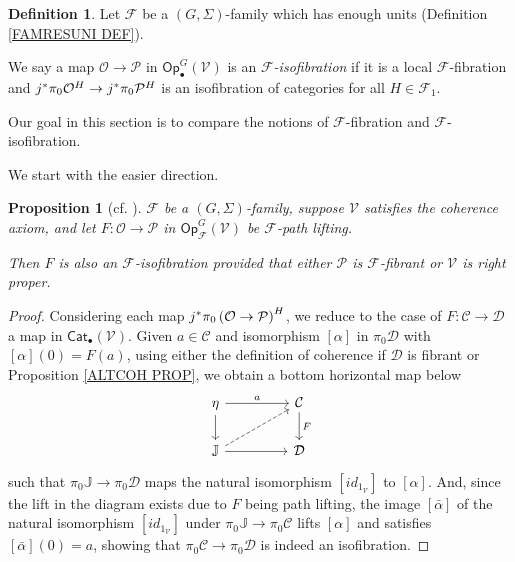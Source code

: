 \documentclass[a4paper,10pt
,draft
]{article}%
\numberwithin{equation}{section}
\numberwithin{figure}{section}
\newtheorem{proposition}[equation]{Proposition}%
\theoremstyle{definition} %
\newtheorem{definition}[equation]{Definition}%
\newcommand{\Op}{\mathsf{Op}}%
\newcommand{\F}{\ensuremath{\mathcal F}}
\newcommand{\V}{\ensuremath{\mathcal V}}
\renewcommand{\O}{\ensuremath{\mathcal O}}
\renewcommand{\P}{\ensuremath{\mathcal P}}
\newcommand{\1}{\ensuremath{\mathbbm 1}}%
\begin{document}
\begin{definition}
	Let $\F$ be a $(G,\Sigma)$-family which has enough units
	(Definition \ref{FAMRESUNI DEF}).
	
	We say a map $\O \to \P$ in $\Op_\bullet^G(\V)$ is an \textit{$\F$-isofibration} if
	it is a local $\F$-fibration and
	$j^{\**}\pi_0 \O^H \to j^{\**}\pi_0\P^H$
	is an isofibration of categories for all $H \in \F_1$.
\end{definition}


Our goal in this section is to compare the 
notions of $\F$-fibration and $\F$-isofibration.

We start with the easier direction.


\begin{proposition}[{cf. \cite[Prop. 2.3]{Ber07b}}]
	\label{ISOFIBEASY PROP}
	$\F$ be a $(G,\Sigma)$-family, 
	suppose $\V$ satisfies the coherence axiom,
	and let 
	$F: \O \to \P$ in $\Op^G_\F(\V)$
	be $\F$-path lifting.
	
	Then $F$ is also an $\F$-isofibration
	provided that either $\mathcal{P}$ is $\F$-fibrant
	or $\V$ is right proper.
\end{proposition}


\begin{proof}
	Considering each map 
	$j^{\**} \pi_0\left(\O \to \P \right)^H$,
	we reduce to 
	the case of $F \colon \mathcal{C} \to \mathcal{D}$
	a map in $\mathsf{Cat}_{\bullet} (\V)$.
	Given $a \in \mathcal{C}$
	and isomorphism $[\alpha]$ in $\pi_0 \mathcal{D}$
	with $[\alpha](0)=F(a)$,
	using either the definition of coherence 
	if $\mathcal{D}$ is fibrant or 
	Proposition \ref{ALTCOH PROP},
	we obtain a bottom horizontal map below 
	\begin{equation}
	\begin{tikzcd}[column sep = 45pt]
	\eta \ar{d} \ar{r}{a}
	&
	\mathcal{C} \ar{d}{F}
	\\
	\mathbb{J} \ar{r} \ar[dashed]{ru}
	&
	\mathcal{D}
	\end{tikzcd}
	\end{equation}
	such that $\pi_0 \mathbb{J} \to \pi_0\mathcal{D}$
	maps the natural isomorphism $[id_{1_{\V}}]$ to $[\alpha]$.
	And,
	since the lift in the diagram exists due to $F$ being path lifting,
	the image $[\bar{\alpha}]$
	of the natural isomorphism $[id_{1_{\V}}]$
	under $\pi_0 \mathbb{J} \to \pi_0\mathcal{C}$
	lifts $[\alpha]$
	and satisfies $[\bar{\alpha}](0) = a$,
	showing that
	$\pi_0 \mathcal{C} \to \pi_0 \mathcal{D}$
	is indeed an isofibration.
\end{proof}
\end{document}
